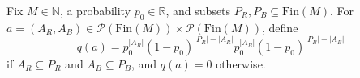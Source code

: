 \begin{definition}
Fix \(M \in \mathbb N\), a probability \(p_0 \in \mathbb R\), and subsets \(P_R, P_B \subseteq \mathrm{Fin}(M)\).
For \(a = (A_R, A_B) \in \mathcal P(\mathrm{Fin}(M)) \times \mathcal P(\mathrm{Fin}(M))\), define
\[
q(a) = p_0^{|A_R|}(1-p_0)^{|P_R|-|A_R|} p_0^{|A_B|}(1-p_0)^{|P_B|-|A_B|}
\]
if \(A_R \subseteq P_R\) and \(A_B \subseteq P_B\), and \(q(a) = 0\) otherwise.
\end{definition}